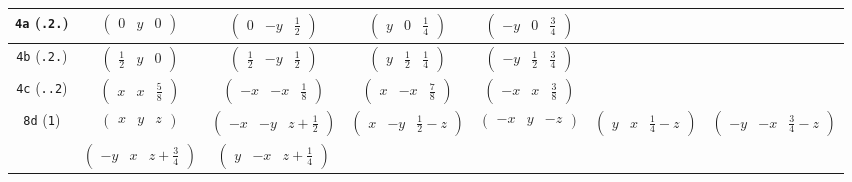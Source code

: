 \documentclass[fleqn,9pt,landscape]{jsarticle}
\begin{document}
\begin{center}
\begin{longtable}{ccccccc}
{\tt 4a} ({\tt .2.}) & $ \begin{pmatrix} 0 & y & 0 \end{pmatrix} $ & $ \begin{pmatrix} 0 & - y & \frac{1}{2} \end{pmatrix} $ & $ \begin{pmatrix} y & 0 & \frac{1}{4} \end{pmatrix} $ & $ \begin{pmatrix} - y & 0 & \frac{3}{4} \end{pmatrix} $ & $  $ & $  $ \\ \hline
{\tt 4b} ({\tt .2.}) & $ \begin{pmatrix} \frac{1}{2} & y & 0 \end{pmatrix} $ & $ \begin{pmatrix} \frac{1}{2} & - y & \frac{1}{2} \end{pmatrix} $ & $ \begin{pmatrix} y & \frac{1}{2} & \frac{1}{4} \end{pmatrix} $ & $ \begin{pmatrix} - y & \frac{1}{2} & \frac{3}{4} \end{pmatrix} $ & $  $ & $  $ \\ \hline
{\tt 4c} ({\tt ..2}) & $ \begin{pmatrix} x & x & \frac{5}{8} \end{pmatrix} $ & $ \begin{pmatrix} - x & - x & \frac{1}{8} \end{pmatrix} $ & $ \begin{pmatrix} x & - x & \frac{7}{8} \end{pmatrix} $ & $ \begin{pmatrix} - x & x & \frac{3}{8} \end{pmatrix} $ & $  $ & $  $ \\ \hline
{\tt 8d} ({\tt 1}) & $ \begin{pmatrix} x & y & z \end{pmatrix} $ & $ \begin{pmatrix} - x & - y & z + \frac{1}{2} \end{pmatrix} $ & $ \begin{pmatrix} x & - y & \frac{1}{2} - z \end{pmatrix} $ & $ \begin{pmatrix} - x & y & - z \end{pmatrix} $ & $ \begin{pmatrix} y & x & \frac{1}{4} - z \end{pmatrix} $ & $ \begin{pmatrix} - y & - x & \frac{3}{4} - z \end{pmatrix} $ \\
& $ \begin{pmatrix} - y & x & z + \frac{3}{4} \end{pmatrix} $ & $ \begin{pmatrix} y & - x & z + \frac{1}{4} \end{pmatrix} $ & $  $ & $  $ & $  $ & $  $ \\
\end{longtable}
\end{center}
\end{document}
